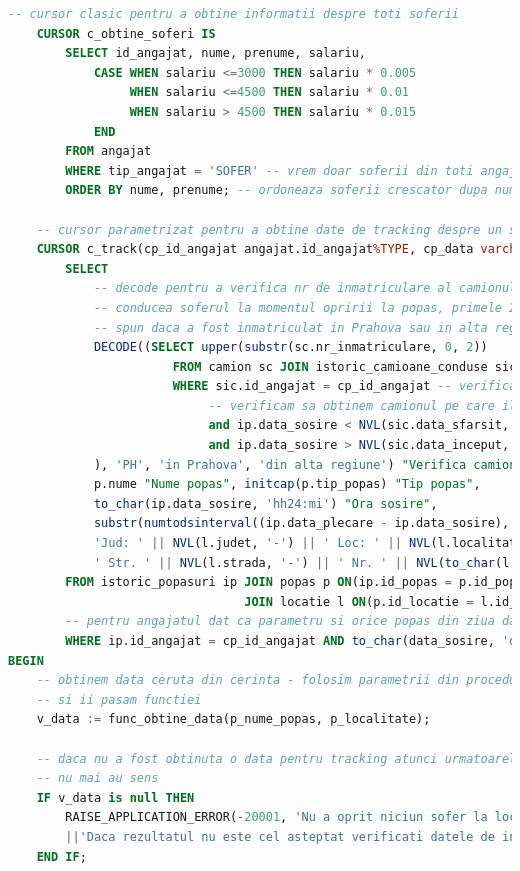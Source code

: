 \documentclass[12pt, a4paper]{article}
\begin{document}
\begin{lstlisting}[language=SQL]
    -- cursor clasic pentru a obtine informatii despre toti soferii
    CURSOR c_obtine_soferi IS
        SELECT id_angajat, nume, prenume, salariu,
            CASE WHEN salariu <=3000 THEN salariu * 0.005
                 WHEN salariu <=4500 THEN salariu * 0.01
                 WHEN salariu > 4500 THEN salariu * 0.015
            END 
        FROM angajat
        WHERE tip_angajat = 'SOFER' -- vrem doar soferii din toti angajatii
        ORDER BY nume, prenume; -- ordoneaza soferii crescator dupa nume si prenume
    
    -- cursor parametrizat pentru a obtine date de tracking despre un sofer dat dupa id-ul de angajat
    CURSOR c_track(cp_id_angajat angajat.id_angajat%TYPE, cp_data varchar2) IS
        SELECT 
			-- decode pentru a verifica nr de inmatriculare al camionului pe care il 
			-- conducea soferul la momentul opririi la popas, primele 2 caractere ne
			-- spun daca a fost inmatriculat in Prahova sau in alta regiune
			DECODE((SELECT upper(substr(sc.nr_inmatriculare, 0, 2))
                       FROM camion sc JOIN istoric_camioane_conduse sic ON(sc.id_camion = sic.id_camion)
                       WHERE sic.id_angajat = cp_id_angajat -- verificam angajatul
							-- verificam sa obtinem camionul pe care il conducea la momentul dat
                            and ip.data_sosire < NVL(sic.data_sfarsit, sysdate)
                            and ip.data_sosire > NVL(sic.data_inceput, sysdate)
            ), 'PH', 'in Prahova', 'din alta regiune') "Verifica camion din Prahova", 
            p.nume "Nume popas", initcap(p.tip_popas) "Tip popas",
            to_char(ip.data_sosire, 'hh24:mi') "Ora sosire",
            substr(numtodsinterval((ip.data_plecare - ip.data_sosire), 'DAY'), 12, 5) "Durata",
            'Jud: ' || NVL(l.judet, '-') || ' Loc: ' || NVL(l.localitate, '-') ||
            ' Str. ' || NVL(l.strada, '-') || ' Nr. ' || NVL(to_char(l.nr), '-') "Locatie popas"
        FROM istoric_popasuri ip JOIN popas p ON(ip.id_popas = p.id_popas)
                                 JOIN locatie l ON(p.id_locatie = l.id_locatie)
		-- pentru angajatul dat ca parametru si orice popas din ziua data
        WHERE ip.id_angajat = cp_id_angajat AND to_char(data_sosire, 'dd-mm-yyyy') = cp_data;
BEGIN
    -- obtinem data ceruta din cerinta - folosim parametrii din procedura 
	-- si ii pasam functiei
    v_data := func_obtine_data(p_nume_popas, p_localitate);
    
    -- daca nu a fost obtinuta o data pentru tracking atunci urmatoarele queries
    -- nu mai au sens
    IF v_data is null THEN
        RAISE_APPLICATION_ERROR(-20001, 'Nu a oprit niciun sofer la locatia data. '
        ||'Daca rezultatul nu este cel asteptat verificati datele de intrare.');
    END IF;
       

\end{lstlisting}
\end{document}
